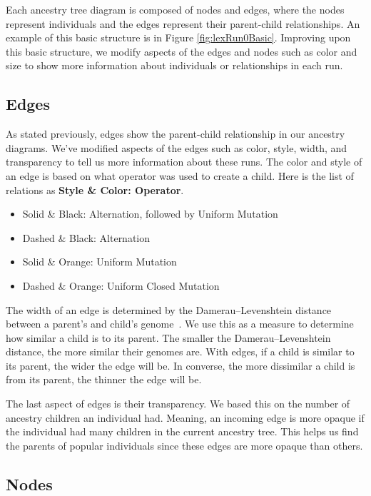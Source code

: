 \documentclass{sig-alternate}
\begin{document}
Each ancestry tree diagram is composed of nodes and edges, where the nodes represent individuals and the edges represent their parent-child relationships. An example of this basic structure is in Figure \ref{fig:lexRun0Basic}. Improving upon this basic structure, we modify aspects of the edges and nodes such as color and size to show more information about individuals or relationships in each run.

\subsection{Edges}
\label{sec:edges}

As stated previously, edges show the parent-child relationship in our ancestry diagrams. We've modified aspects of the edges such as color, style, width, and transparency to tell us more information about these runs. The color and style of an edge is based on what operator was used to create a child. Here is the list of relations as \textbf{Style \& Color: Operator}.
\begin{itemize}
\setlength\itemsep{0em}
\item Solid \& Black: Alternation, followed by Uniform Mutation
\item Dashed \& Black: Alternation
\item Solid \& Orange: Uniform Mutation
\item Dashed \& Orange: Uniform Closed Mutation
\end{itemize}

The width of an edge is determined by the Damerau--Levenshtein distance between a parent's and child's genome~\cite{wiki:DLdist}. We use this as a measure to determine how similar a child is to its parent. The smaller the Damerau--Levenshtein distance, the more similar their genomes are. With edges, if a child is similar to its parent, the wider the edge will be. In converse, the more dissimilar a child is from its parent, the thinner the edge will be.

The last aspect of edges is their transparency. We based this on the number of ancestry children an individual had. Meaning, an incoming edge is more opaque if the individual had many children in the current ancestry tree. This helps us find the parents of popular individuals since these edges are more opaque than others.

\subsection{Nodes}
\label{sec:nodes}
\end{document}
